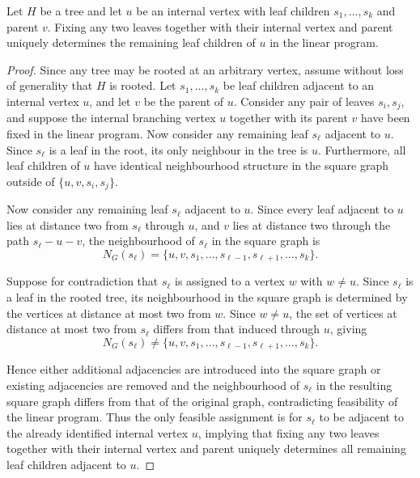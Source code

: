 \begin{proposition} \label{prop::tetrahedron_fixing}
  Let $H$ be a tree and let $u$ be an internal vertex with leaf children $s_1,\dots,s_k$ and parent $v$. Fixing any two leaves together with their internal vertex and parent uniquely determines the remaining leaf children of $u$ in the linear program.
\end{proposition}
\begin{proof}
  Since any tree may be rooted at an arbitrary vertex, assume without loss of generality that $H$ is rooted. Let $s_1,\dots,s_k$ be leaf children adjacent to an internal vertex $u$, and let $v$ be the parent of $u$. Consider any pair of leaves $s_i,s_j$, and suppose the internal branching vertex $u$ together with its parent $v$ have been fixed in the linear program. Now consider any remaining leaf $s_\ell$ adjacent to $u$. Since $s_\ell$ is a leaf in the root, its only neighbour in the tree is $u$. Furthermore, all leaf children of $u$ have identical neighbourhood structure in the square graph outside of $\{u,v,s_i,s_j\}$.

  Now consider any remaining leaf $s_\ell$ adjacent to $u$. Since every leaf adjacent to $u$ lies at distance two from $s_\ell$ through $u$, and $v$ lies at distance two through the path $s_\ell-u-v$, the neighbourhood of $s_\ell$ in the square graph is
  \[
  N_G(s_\ell) = \{u,v,s_1,\dots,s_{\ell-1},s_{\ell+1},\dots,s_k\}.
  \]

  Suppose for contradiction that $s_\ell$ is assigned to a vertex $w$ with $w\neq u$. Since $s_\ell$ is a leaf in the rooted tree, its neighbourhood in the square graph is determined by the vertices at distance at most two from $w$. Since $w\neq u$, the set of vertices at distance at most two from $s_\ell$ differs from that induced through $u$, giving
  \[
  N_G(s_\ell)
  \neq
  \{u,v,s_1,\dots,s_{\ell-1},s_{\ell+1},\dots,s_k\}.
  \]

  Hence either additional adjacencies are introduced into the square graph or existing adjacencies are removed and the neighbourhood of $s_\ell$ in the resulting square graph differs from that of the original graph, contradicting feasibility of the linear program. Thus the only feasible assignment is for $s_\ell$ to be adjacent to the already identified internal vertex $u$, implying that fixing any two leaves together with their internal vertex and parent uniquely determines all remaining leaf children adjacent to $u$.
\end{proof}